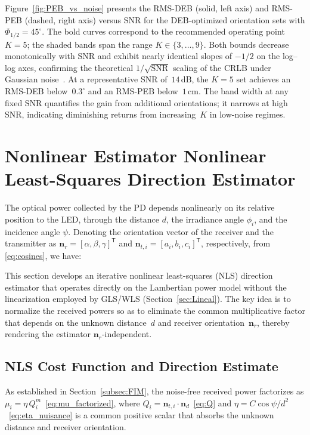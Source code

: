 \documentclass[journal]{IEEEtran}
\newcommand{\added}[1]{{\color{blue}#1}}
\newcommand{\deleted}[1]{{\color{red}#1}}
\begin{document}
\added{
Figure~\ref{fig:PEB_vs_noise} presents the RMS-DEB (solid, left axis) and RMS-PEB (dashed, right axis) versus SNR for the DEB-optimized orientation sets with \(\Phi_{1/2}=45^\circ\). The bold curves correspond to the recommended operating point \(K=5\); the shaded bands span the range \(K\in\{3,\ldots,9\}\). Both bounds decrease monotonically with SNR and exhibit nearly identical slopes of \(-1/2\) on the log--log axes, confirming the theoretical \(1/\sqrt{\mathrm{SNR}}\) scaling of the CRLB under Gaussian noise~\cite{Kay1993}. At a representative SNR of~\(14\)\,dB, the \(K=5\) set achieves an RMS-DEB below~\(0.3^\circ\) and an RMS-PEB below~\(1\)\,cm. The band width at any fixed SNR quantifies the gain from additional orientations; it narrows at high SNR, indicating diminishing returns from increasing~\(K\) in low-noise regimes.
}

\section{\deleted{Nonlinear Estimator} \added{Nonlinear Least-Squares Direction Estimator}}
\label{sec:NoLineal}

\deleted{The optical power collected by the PD depends nonlinearly on its
relative position to the LED, through the distance $d$, the irradiance angle
$\phi_{i}$, and the incidence angle $\psi$.  Denoting the orientation vector of the receiver
and the transmitter as $\mathbf n_{r}=[\alpha,\beta,\gamma]^{\mathsf T}$ and $\mathbf n_{t,i}=[a_i,b_i,c_i]^{\mathsf T}$, respectively, from \eqref{eq:cosines}, we have:}

\added{This section develops an iterative nonlinear least-squares (NLS) direction estimator that operates directly on the Lambertian power model without the linearization employed by GLS/WLS (Section~\ref{sec:Lineal}). The key idea is to normalize the received powers so as to eliminate the common multiplicative factor that depends on the unknown distance~$d$ and receiver orientation~$\mathbf{n}_r$, thereby rendering the estimator $\mathbf{n}_r$-independent.}

\added{\subsection{NLS Cost Function and Direction Estimate}}

\added{As established in Section~\ref{subsec:FIM}, the noise-free received power factorizes as $\mu_i = \eta\,Q_i^m$~\eqref{eq:mu_factorized}, where $Q_i = \mathbf{n}_{t,i}\cdot\mathbf{n}_d$~\eqref{eq:Q} and $\eta = C\cos\psi/d^2$~\eqref{eq:eta_nuisance} is a common positive scalar that absorbs the unknown distance and receiver orientation.}
\end{document}
